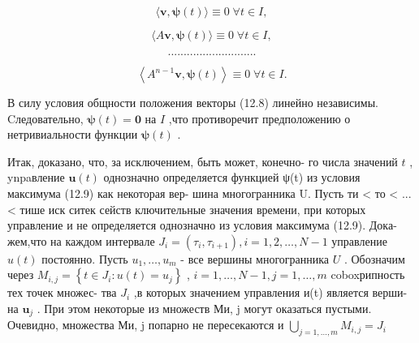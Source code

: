 \documentclass[8pt]{extarticle}
\begin{document}
\[
\langle \mathbf{v},\mathbf{\psi }\left( t\right) \rangle  \equiv  0\;\forall t \in  I,
\]

\[
\langle A\mathbf{v},\mathbf{\psi }\left( t\right) \rangle  \equiv  0\;\forall t \in  I,
\]

\[
\text{ ............................ }
\]

\[
\left\langle  {{A}^{n - 1}\mathbf{v},\mathbf{\psi }\left( t\right) }\right\rangle   \equiv  0\;\forall t \in  I.
\]

В силу условия общности положения векторы (12.8) линейно независимы. Cледовательно, \(\mathbf{\psi }\left( t\right)  = \mathbf{0}\) на \(I\) ,что противоречит предположению о нетривиальности функции \(\mathbf{\psi }\left( t\right)\) .

Итак, доказано, что, за исключением, быть может, конечно- го числа значений \(t\) , ynpaвление \(\mathbf{u}\left( t\right)\) однозначно определяется функцией ψ(t) из условия максимума (12.9) как некоторая вер- шина многогранника U. Пусть ти < то < ... < тише иск ситек сейств ключительные значения времени, при которых управление и не определяется однозначно из условия максимума (12.9). Дока- жем,что на каждом интервале \({J}_{i} = \left( {{\tau }_{i},{\tau }_{i + 1}}\right) ,i = 1,2,\ldots ,N - 1\) управление \(u\left( t\right)\) постоянно. Пусть \({u}_{1},\ldots ,{u}_{m}\) - все вершины многогранника \(U\) . Обозначим через \({M}_{i,j} = \left\{  {t \in  {J}_{i} : u\left( t\right)  = {u}_{j}}\right\}\) , \(i = 1,\ldots ,N - 1,j = 1,\ldots ,m\) coboxрипность тех точек множес- тва \({J}_{i}\) ,в которых значением управления и(t) является верши- на \({\mathbf{u}}_{j}\) . При этом некоторые из множеств Ми, j могут оказаться пустыми. Очевидно, множества Ми, j попарно не пересекаются и \(\mathop{\bigcup }\limits_{{j = 1,\ldots ,m}}{M}_{i,j} = {J}_{i}\)
\end{document}
